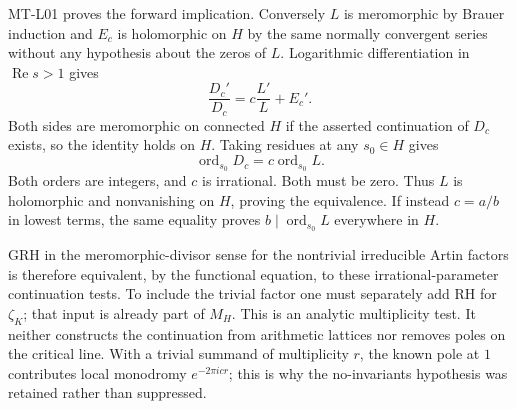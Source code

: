 MT-L01 proves the forward implication.  Conversely $L$ is meromorphic by
Brauer induction and $E_c$ is holomorphic on $H$ by the same normally
convergent series without any hypothesis about the zeros of $L$.
Logarithmic differentiation in $\operatorname{Re}s>1$ gives
\[
 \frac{D_c'}{D_c}=c\frac{L'}L+E_c'.
\]
Both sides are meromorphic on connected $H$ if the asserted continuation
of $D_c$ exists, so the identity holds on $H$.  Taking residues at any
$s_0\in H$ gives
\[
 \operatorname{ord}_{s_0}D_c
      =c\operatorname{ord}_{s_0}L.
\]
Both orders are integers, and $c$ is irrational.  Both must be zero.
Thus $L$ is holomorphic and nonvanishing on $H$, proving the equivalence.
If instead $c=a/b$ in lowest terms, the same equality proves
$b\mid\operatorname{ord}_{s_0}L$ everywhere in $H$.

GRH in the meromorphic-divisor sense for the nontrivial irreducible Artin
factors is therefore equivalent, by the functional equation, to these
irrational-parameter continuation tests.  To include the trivial factor one
must separately add RH for $\zeta_K$; that input is already part of $M_H$.
This is an analytic multiplicity test.  It neither constructs the
continuation from arithmetic lattices nor removes poles on the critical
line.  With a trivial summand of multiplicity $r$, the known pole at $1$
contributes local monodromy $e^{-2\pi i c r}$; this is why the no-invariants
hypothesis was retained rather than suppressed.
